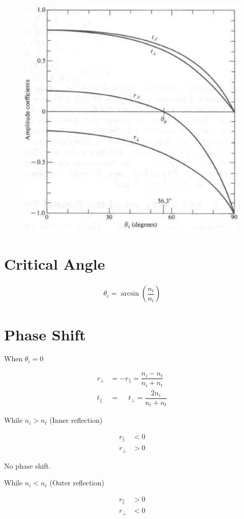 \begin{figure}[H]
  \centering
  \includegraphics[width=0.3\linewidth]{figures/Polarization-angle}
  \label{fig:}
\end{figure}

\section{Critical Angle}

\begin{equation*}
  \begin{aligned}
    \theta_c = \arcsin \left( \dfrac{n_t}{n_i}  \right)
  \end{aligned}
\end{equation*}

\section{Phase Shift}

When $\theta_i = 0$

\begin{equation*}
  \begin{aligned}
    r_{\perp} &= - r_{\parallel} = \dfrac{n_i - n_t}{n_i + n_t} \\
    t_{\parallel} &= \phantom{+} t_{\perp} = \dfrac{2 n_i}{n_i + n_t} 
  \end{aligned}
\end{equation*}

While $n_i > n_t$ (Inner reflection)

\begin{equation*}
  \begin{aligned}
    r_{\parallel} &< 0 \\
    r_{\perp} &> 0
  \end{aligned}
\end{equation*}

No phase shift.

While $n_i < n_t$ (Outer reflection)

\begin{equation*}
  \begin{aligned}
    r_{\parallel} &> 0 \\
    r_{\perp} &< 0
  \end{aligned}
\end{equation*}


